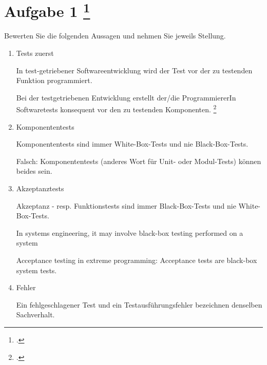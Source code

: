 \documentclass{lehramt-informatik-aufgabe}
\begin{document}
\section{Aufgabe 1
\footcite{examen:66116:2019:03}}

Bewerten Sie die folgenden Aussagen und nehmen Sie jeweils Stellung.

\begin{enumerate}

\item Tests zuerst

In test-getriebener Softwareentwicklung wird der Test vor der zu
testenden Funktion programmiert.

\begin{liAntwort}
Bei der testgetriebenen Entwicklung erstellt der/die ProgrammiererIn
Softwaretests konsequent vor den zu testenden Komponenten.
\footcite{wiki:testgetriebene-entwicklung}
\end{liAntwort}


\item Komponententests

Komponententests sind immer White-Box-Tests und nie Black-Box-Tests.

\begin{liAntwort}
Falsch: Komponententests (anderes Wort für Unit- oder Modul-Tests) können beides sein.
\end{liAntwort}


\item Akzeptanztests

Akzeptanz - resp. Funktionstests sind immer Black-Box-Tests und nie
White-Box-Tests.

\begin{liAntwort}
In systems engineering, it may involve black-box testing performed on a system

Acceptance testing in extreme programming:  Acceptance tests are black-box system tests.

\end{liAntwort}


\item Fehler

Ein fehlgeschlagener Test und ein Testausführungsfehler bezeichnen
denselben Sachverhalt.


\end{enumerate}
\end{document}
